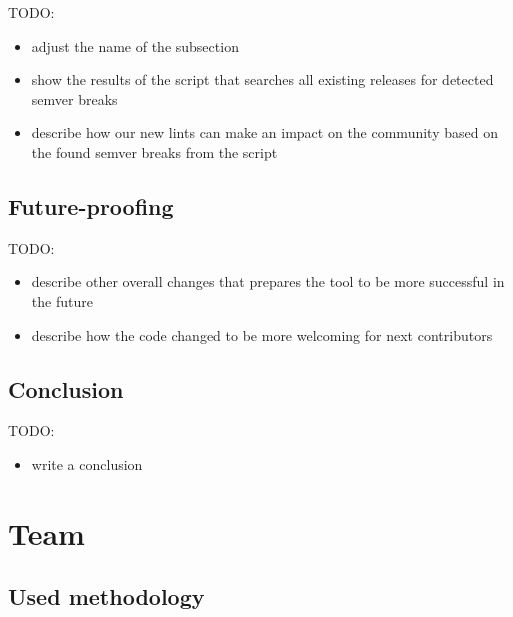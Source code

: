 \documentclass[licencjacka,en]{pracamgr}
\begin{document}
TODO:
\begin{itemize}
        \item adjust the name of the subsection
        \item show the results of the script that searches all existing releases for detected semver breaks
	\item describe how our new lints can make an impact on the community based on the found semver breaks from the script
\end{itemize}

\section{Future-proofing}

TODO:
\begin{itemize}
	\item describe other overall changes that prepares the tool to be more successful in the future
	\item describe how the code changed to be more welcoming for next contributors
\end{itemize}

\section{Conclusion}

TODO:
\begin{itemize}
	\item write a conclusion
\end{itemize}

\chapter{Team}\label{r:chapter_team}

\section{Used methodology}
\end{document}
